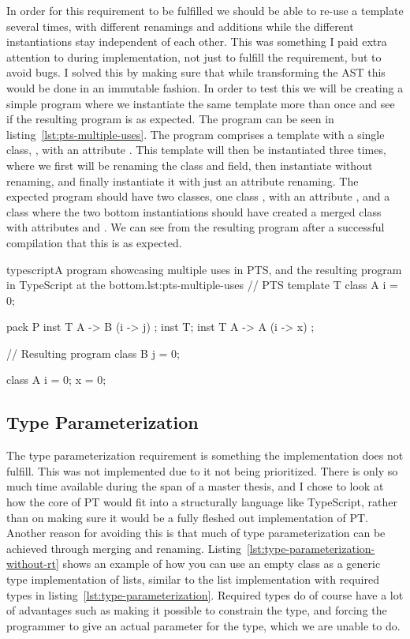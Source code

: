 In order for this requirement to be fulfilled we should be able to re-use a template several times, with different renamings and additions while the different instantiations stay independent of each other.
This was something I paid extra attention to during implementation, not just to fulfill the requirement, but to avoid bugs.
I solved this by making sure that while transforming the AST this would be done in an immutable fashion.
In order to test this we will be creating a simple program where we instantiate the same template more than once and see if the resulting program is as expected.
The program can be seen in listing~\vref{lst:pts-multiple-uses}.
The program comprises a template  with a single class, , with an attribute .
This template will then be instantiated three times, where we first will be renaming the class and field, then instantiate without renaming, and finally instantiate it with just an attribute renaming.
The expected program should have two classes, one class , with an attribute , and a class  where the two bottom instantiations should have created a merged class with attributes  and .
We can see from the resulting program after a successful compilation that this is as expected.

\begin{code}{typescript}{A program showcasing multiple uses in PTS, and the resulting program in TypeScript at the bottom.}{lst:pts-multiple-uses}
    // PTS
    template T {
        class A {
            i = 0;
        }
    }

    pack P {
        inst T { A -> B (i -> j) };
        inst T;
        inst T { A -> A (i -> x) };
    }

    // Resulting program
    class B {
        j = 0;
    }

    class A {
        i = 0;
        x = 0;
    }
\end{code}

\subsection{Type Parameterization}\label{subsec:pts-type-parameterization}

The type parameterization requirement is something the implementation does not fulfill.
This was not implemented due to it not being prioritized.
There is only so much time available during the span of a master thesis, and I chose to look at how the core of PT would fit into a structurally language like TypeScript, rather than on making sure it would be a fully fleshed out implementation of PT\@.
Another reason for avoiding this is that much of type parameterization can be achieved through merging and renaming.
Listing~\vref{lst:type-parameterization-without-rt} shows an example of how you can use an empty class as a generic type implementation of lists, similar to the list implementation with required types in listing~\vref{lst:type-parameterization}.
Required types do of course have a lot of advantages such as making it possible to constrain the type, and forcing the programmer to give an actual parameter for the type, which we are unable to do.


